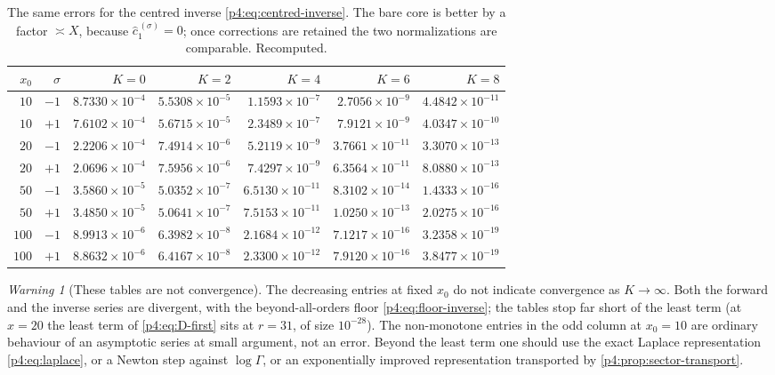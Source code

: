 \documentclass[11pt,a4paper,oneside]{book}
\theoremstyle{plain}
\theoremstyle{definition}
\theoremstyle{remark}
\newtheorem{warning}[theorem]{Warning}
\newcommand{\Xcore}{X}
\begin{document}
\begin{table}[htbp]
\centering
\caption{The same errors for the centred inverse
\cref{p4:eq:centred-inverse}.  The bare core is better by a factor
$\asymp\Xcore$, because $\widehat c^{\,(\sigma)}_1=0$; once corrections are
retained the two normalizations are comparable.  Recomputed.}
\label{p4:tab:centred-errors}
\small
\begin{tabular}{@{}rrrrrrr@{}}
\toprule
$x_0$&$\sigma$&$K=0$&$K=2$&$K=4$&$K=6$&$K=8$\\
\midrule
$10$&$-1$&$8.7330\!\times\!10^{-4}$&$5.5308\!\times\!10^{-5}$&$1.1593\!\times\!10^{-7}$&$2.7056\!\times\!10^{-9}$&$4.4842\!\times\!10^{-11}$\\
$10$&$+1$&$7.6102\!\times\!10^{-4}$&$5.6715\!\times\!10^{-5}$&$2.3489\!\times\!10^{-7}$&$7.9121\!\times\!10^{-9}$&$4.0347\!\times\!10^{-10}$\\
$20$&$-1$&$2.2206\!\times\!10^{-4}$&$7.4914\!\times\!10^{-6}$&$5.2119\!\times\!10^{-9}$&$3.7661\!\times\!10^{-11}$&$3.3070\!\times\!10^{-13}$\\
$20$&$+1$&$2.0696\!\times\!10^{-4}$&$7.5956\!\times\!10^{-6}$&$7.4297\!\times\!10^{-9}$&$6.3564\!\times\!10^{-11}$&$8.0880\!\times\!10^{-13}$\\
$50$&$-1$&$3.5860\!\times\!10^{-5}$&$5.0352\!\times\!10^{-7}$&$6.5130\!\times\!10^{-11}$&$8.3102\!\times\!10^{-14}$&$1.4333\!\times\!10^{-16}$\\
$50$&$+1$&$3.4850\!\times\!10^{-5}$&$5.0641\!\times\!10^{-7}$&$7.5153\!\times\!10^{-11}$&$1.0250\!\times\!10^{-13}$&$2.0275\!\times\!10^{-16}$\\
$100$&$-1$&$8.9913\!\times\!10^{-6}$&$6.3982\!\times\!10^{-8}$&$2.1684\!\times\!10^{-12}$&$7.1217\!\times\!10^{-16}$&$3.2358\!\times\!10^{-19}$\\
$100$&$+1$&$8.8632\!\times\!10^{-6}$&$6.4167\!\times\!10^{-8}$&$2.3300\!\times\!10^{-12}$&$7.9120\!\times\!10^{-16}$&$3.8477\!\times\!10^{-19}$\\
\bottomrule
\end{tabular}
\end{table}

\begin{warning}[These tables are not convergence]
\label{p4:rem:not-convergence}
The decreasing entries at fixed $x_0$ do not indicate convergence as
$K\to\infty$.  Both the forward and the inverse series are divergent, with the
beyond-all-orders floor \cref{p4:eq:floor-inverse}; the tables stop far short
of the least term (at $x=20$ the least term of \cref{p4:eq:D-first} sits at
$r=31$, of size $10^{-28}$).  The non-monotone entries in the odd column at
$x_0=10$ are ordinary behaviour of an asymptotic series at small argument, not
an error.  Beyond the least term one should use the exact Laplace
representation \cref{p4:eq:laplace}, or a Newton step against $\log\Gamma$, or
an exponentially improved representation transported by
\cref{p4:prop:sector-transport}.
\end{warning}
\end{document}
